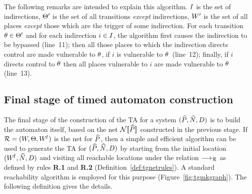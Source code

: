 The following remarks are intended to explain this algorithm.
$I$ is the set of indirections, $\Theta'$ is the set of all
transitions \emph{except} indirections, $W'$ is the set of all places
\emph{except} those which are the trigger of some indirection.  For
each transition $\theta \in \Theta'$ and for each indirection $i \in I$, the
algorithm first causes the indirection to be bypassed (line~11); then
all those places to which the indirection directs control
are made vulnerable to $\theta$, if $i$ is vulnerable to $\theta$~(line~12); finally,
if $i$ directs control to $\theta$ then all places vulnerable to $i$ are
made vulnerable to $\theta$ (line~13).

\subsection{Final stage of timed automaton construction}
The final stage of the construction of the TA for a system
$({\widehat{P}},{\widehat{N}},{D})$ is to build the automaton itself, based on the net
${\mathcal{N}[\![{\widehat{P}}]\!]}$ constructed in the previous stage. 
If $\RR = (\W,\T,\WI)$ is the net for ${\widehat{P}}$, then a simple and efficient 
algorithm can be used to generate the TA for $({\widehat{P}},{\widehat{N}},{D})$ by
starting from the initial location $(W^{\!I},{\widehat{N}},{D})$ and visiting
all reachable locations under the relation $\goesr{}$ as defined by
rules \textbf{R.1} and \textbf{R.2} (Definition~\ref{def:tgnetrules}).
A standard reachability algorithm is employed for this
purpose (Figure~\ref{fig:tgmkgraph}). The following definition gives the 
details.
